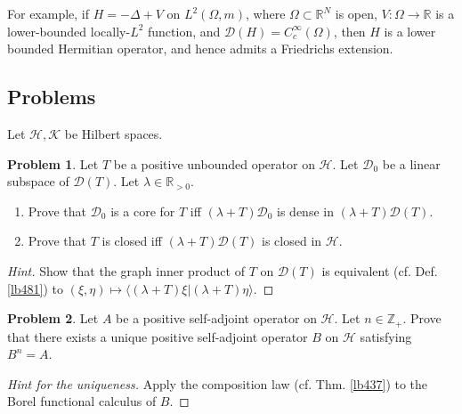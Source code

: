 \documentclass[12pt,b5paper,notitlepage]{article}
\theoremstyle{definition}
\newtheorem{prob}{\color{red}Problem}[section]
\theoremstyle{plain}
\newcommand{\Dom}{\mathscr{D}}
\newcommand{\bk}[1]{\langle {#1}\rangle}
\newcommand{\Zbb}{\mathbb Z}
\newcommand{\Rbb}{\mathbb R}
\newcommand{\MH}{\mathcal H}
\newcommand{\MK}{\mathcal K}
\numberwithin{equation}{section}
\begin{document}
For example, if $H=-\Delta+V$ on $L^2(\Omega,m)$, where $\Omega\subset\Rbb^N$ is open, $V:\Omega\rightarrow\Rbb$ is a lower-bounded locally-$L^2$ function, and $\Dom(H)=C_c^\infty(\Omega)$, then $H$ is a lower bounded Hermitian operator, and hence admits a Friedrichs extension.











\hypertarget{current}{}


\subsection{Problems}


Let $\MH,\MK$ be Hilbert spaces.


\begin{prob}\label{lb482}
Let $T$ be a positive unbounded operator on $\MH$. Let $\Dom_0$ be a linear subspace of $\Dom(T)$. Let $\lambda\in\Rbb_{>0}$.
\begin{enumerate}
\item Prove that $\Dom_0$ is a core for $T$ iff $(\lambda+T)\Dom_0$ is dense in $(\lambda+T)\Dom(T)$.
\item Prove that $T$ is closed iff $(\lambda+T)\Dom(T)$ is closed in $\MH$.
\end{enumerate} 
\end{prob}

\begin{proof}[Hint]
Show that the graph inner product of $T$ on $\Dom(T)$ is equivalent (cf. Def. \ref{lb481}) to $(\xi,\eta)\mapsto\bk{(\lambda+T)\xi|(\lambda+T)\eta}$.
\end{proof}


\begin{prob}
Let $A$ be a positive self-adjoint operator on $\MH$. Let $n\in\Zbb_+$. Prove that there exists a unique positive self-adjoint operator $B$ on $\MH$ satisfying $B^n=A$.
\end{prob}


\begin{proof}[Hint for the uniqueness]
Apply the composition law (cf. Thm. \ref{lb437}) to the Borel functional calculus of $B$.
\end{proof}
\end{document}
